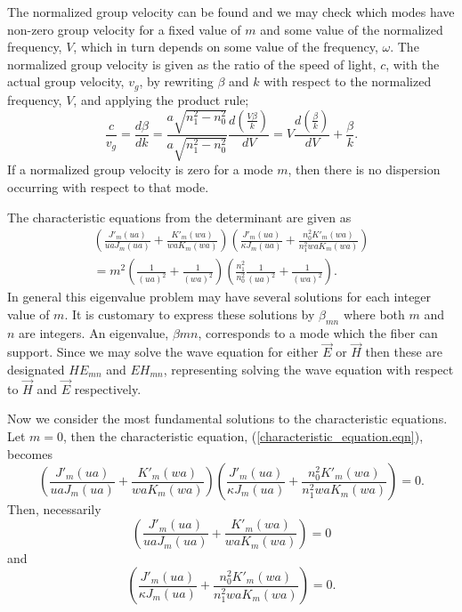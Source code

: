 \documentclass[12pt]{article}
\theoremstyle{definition}
\numberwithin{equation}{section}
\begin{document}
{The normalized group velocity can be found and we may check which modes have non-zero group velocity for a fixed value of $m$ and some value of the normalized frequency, $V$, which in turn depends on some value of the frequency, $\omega$. The normalized group velocity is given as the ratio of the speed of light, $c$, with the actual group velocity, $v_g$, by rewriting $\beta$ and $k$ with respect to the normalized frequency, $V$, and applying the product rule;
$$\frac{c}{v_g}=\frac{d\beta}{d k}=\frac{a\sqrt{n_1^2-n_0^2}}{a\sqrt{n_1^2-n_0^2}}\frac{d(\frac{V\beta}{k})}{dV}=V\frac{d\left(\frac{\beta}{k}\right)}{dV}+\frac{\beta}{k}.$$
If a normalized group velocity is zero for a mode $m$, then there is no dispersion occurring with respect to that mode.

The characteristic equations from the determinant are given as
\begin{multline}
\left(\frac{J'_m(ua)}{uaJ_m(ua)}+\frac{K'_m(wa)}{waK_m(wa)}\right)\left(\frac{J'_m(ua)}{\kappa J_m(ua)}+\frac{n_0^2K'_m(wa)}{n_1^2wa K_m(wa)}\right)\\=m^2\left(\frac{1}{(ua)^2}+\frac{1}{(wa)^2}\right) \left(\frac{n_1^2}{n_0^2}\frac{1}{(ua)^2}+\frac{1}{(wa)^2}\right).\label{characteristic_equation.eqn}
\end{multline}
In general this eigenvalue problem may have several solutions for each integer value of $m$. It is customary to express these solutions by $\beta_{mn}$ where both $m$ and $n$ are integers. An eigenvalue, $\beta{mn}$, corresponds to a mode which the fiber can support. Since we may solve the wave equation for either $\vec{E}$ or $\vec{H}$ then these are designated $HE_{mn}$ and $EH_{mn}$, representing solving the wave equation with respect to $\vec{H}$ and $\vec{E}$ respectively.

Now we consider the most fundamental solutions to the characteristic equations. Let $m=0$, then the characteristic equation, (\ref{characteristic_equation.eqn}), becomes 
\begin{equation}
\left(\frac{J'_m(ua)}{uaJ_m(ua)}+\frac{K'_m(wa)}{waK_m(wa)}\right)\left(\frac{J'_m(ua)}{\kappa J_m(ua)}+\frac{n_0^2K'_m(wa)}{n_1^2wa K_m(wa)}\right)=0\nonumber.
\end{equation}
Then, necessarily
\begin{equation}\left(\frac{J'_m(ua)}{uaJ_m(ua)}+\frac{K'_m(wa)}{waK_m(wa)}\right)=0
\label{TE.eqn}\end{equation}
and
\begin{equation}
\left(\frac{J'_m(ua)}{\kappa J_m(ua)}+\frac{n_0^2K'_m(wa)}{n_1^2wa K_m(wa)}\right)=0.
\label{TM.eqn}
\end{equation}

}
\end{document}
